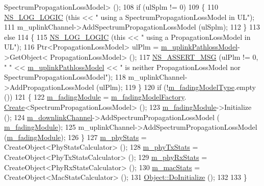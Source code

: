 \begin{DoxyCode}
      SpectrumPropagationLossModel> ();
108   \textcolor{keywordflow}{if} (ulSplm != 0)
109     \{
110       \hyperlink{group__logging_ga88acd260151caf2db9c0fc84997f45ce}{NS\_LOG\_LOGIC} (\textcolor{keyword}{this} << \textcolor{stringliteral}{" using a SpectrumPropagationLossModel in UL"});
111       m\_uplinkChannel->AddSpectrumPropagationLossModel (ulSplm);
112     \}
113   \textcolor{keywordflow}{else}
114     \{
115       \hyperlink{group__logging_ga88acd260151caf2db9c0fc84997f45ce}{NS\_LOG\_LOGIC} (\textcolor{keyword}{this} << \textcolor{stringliteral}{" using a PropagationLossModel in UL"});
116       Ptr<PropagationLossModel> ulPlm = \hyperlink{classns3_1_1LteHelper_a0b121aecc2a13aab12908c8547ba336b}{m\_uplinkPathlossModel}->GetObject<
      PropagationLossModel> ();
117       \hyperlink{assert_8h_aff5ece9066c74e681e74999856f08539}{NS\_ASSERT\_MSG} (ulPlm != 0, \textcolor{stringliteral}{" "} << \hyperlink{classns3_1_1LteHelper_a0b121aecc2a13aab12908c8547ba336b}{m\_uplinkPathlossModel} << \textcolor{stringliteral}{" is
       neither PropagationLossModel nor SpectrumPropagationLossModel"});
118       m\_uplinkChannel->AddPropagationLossModel (ulPlm);
119     \}
120   \textcolor{keywordflow}{if} (!\hyperlink{classns3_1_1LteHelper_a33824762076dc0f25e054347b153f255}{m\_fadingModelType}.empty ())
121     \{
122       \hyperlink{classns3_1_1LteHelper_ab986df63e68ba63cb4d2c95bdbf9f47a}{m\_fadingModule} = \hyperlink{classns3_1_1LteHelper_afd0de2f516f15d3a7be64f0ca7e7b7fc}{m\_fadingModelFactory}.
      \hyperlink{classns3_1_1ObjectFactory_a18152e93f0a6fe184ed7300cb31e9896}{Create}<SpectrumPropagationLossModel> ();
123       \hyperlink{classns3_1_1LteHelper_ab986df63e68ba63cb4d2c95bdbf9f47a}{m\_fadingModule}->Initialize ();
124       \hyperlink{classns3_1_1LteHelper_a5c2237946550d801d80c0d0bee0b4cfb}{m\_downlinkChannel}->AddSpectrumPropagationLossModel (
      \hyperlink{classns3_1_1LteHelper_ab986df63e68ba63cb4d2c95bdbf9f47a}{m\_fadingModule});
125       m\_uplinkChannel->AddSpectrumPropagationLossModel (\hyperlink{classns3_1_1LteHelper_ab986df63e68ba63cb4d2c95bdbf9f47a}{m\_fadingModule});
126     \}
127   \hyperlink{classns3_1_1LteHelper_aa58d6da60336a1a62434e737007f66d4}{m\_phyStats} = CreateObject<PhyStatsCalculator> ();
128   \hyperlink{classns3_1_1LteHelper_a6bd4ce0109b43d51150164038eba7a01}{m\_phyTxStats} = CreateObject<PhyTxStatsCalculator> ();
129   \hyperlink{classns3_1_1LteHelper_a836b5bbfbc6a350d578833309f237854}{m\_phyRxStats} = CreateObject<PhyRxStatsCalculator> ();
130   \hyperlink{classns3_1_1LteHelper_a4b5eb57c346e6876a53d5c79f629513a}{m\_macStats} = CreateObject<MacStatsCalculator> ();
131   \hyperlink{classns3_1_1Object_af8482a521433409fb5c7f749398c9dbe}{Object::DoInitialize} ();
132 
133 \}
\end{DoxyCode}


